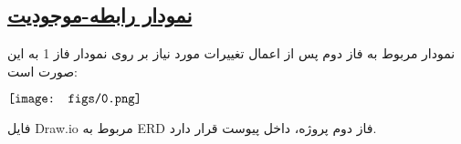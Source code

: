 \subsection*{\underline{نمودار رابطه-موجودیت}}

نمودار مربوط به فاز دوم پس از اعمال تغییرات مورد نیاز بر روی نمودار فاز 1 به این صورت است:

$\\ \texttt{[image: figs/0.png]} \\ \\$

فایل Draw.io مربوط به ERD فاز دوم پروژه، داخل پیوست قرار دارد. 

\pagebreak

